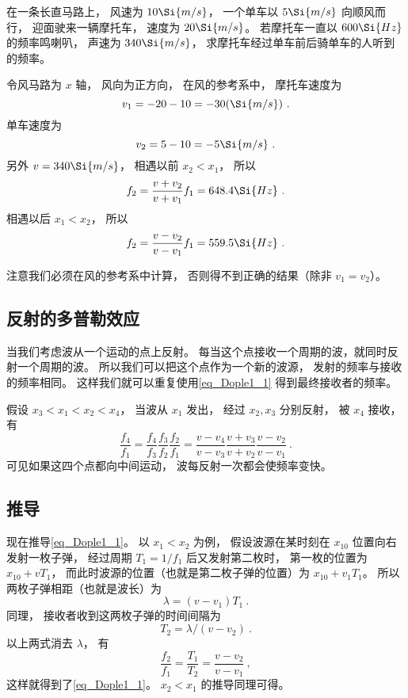 \begin{exercise}{}
在一条长直马路上， 风速为 $10\Si{m/s}$， 一个单车以 $5\Si{m/s}$ 向顺风而行， 迎面驶来一辆摩托车， 速度为 $20\Si{m/s}$。 若摩托车一直以 $600\Si{Hz}$ 的频率鸣喇叭， 声速为 $340\Si{m/s}$， 求摩托车经过单车前后骑单车的人听到的频率。

令风马路为 $x$ 轴， 风向为正方向， 在风的参考系中， 摩托车速度为
\begin{equation}
v_1 = -20 - 10 = -30(\Si{m/s})~.
\end{equation}
单车速度为
\begin{equation}
v_2 = 5 - 10 = -5\Si{m/s}~.
\end{equation}
另外 $v = 340\Si{m/s}$， 相遇以前 $x_2 < x_1$， 所以
\begin{equation}
f_2 = \frac{v + v_2}{v + v_1} f_1 = 648.4\Si{Hz}~.
\end{equation}
相遇以后 $x_1 < x_2$， 所以
\begin{equation}
f_2 = \frac{v - v_2}{v - v_1} f_1 = 559.5\Si{Hz}~.
\end{equation}
\end{exercise}
注意我们必须在风的参考系中计算， 否则得不到正确的结果（除非 $v_1 = v_2$）。

\subsection{反射的多普勒效应}
当我们考虑波从一个运动的点上反射。 每当这个点接收一个周期的波，就同时反射一个周期的波。 所以我们可以把这个点作为一个新的波源， 发射的频率与接收的频率相同。 这样我们就可以重复使用\autoref{eq_Dople1_1} 得到最终接收者的频率。

\begin{example}{}
假设 $x_3 < x_1 < x_2 < x_4$， 当波从 $x_1$ 发出， 经过 $x_2, x_3$ 分别反射， 被 $x_4$ 接收， 有
\begin{equation}
\frac{f_4}{f_1} = \frac{f_4}{f_3}\frac{f_3}{f_2}\frac{f_2}{f_1}
= \frac{v - v_4}{v - v_3}\frac{v + v_3}{v + v_2}\frac{v - v_2}{v - v_1}~.
\end{equation}
可见如果这四个点都向中间运动， 波每反射一次都会使频率变快。
\end{example}

\subsection{推导}
现在推导\autoref{eq_Dople1_1}。 以 $x_1 < x_2$ 为例， 假设波源在某时刻在 $x_{10}$ 位置向右发射一枚子弹， 经过周期 $T_1 = 1/f_1$ 后又发射第二枚时， 第一枚的位置为 $x_{10} + vT_1$， 而此时波源的位置（也就是第二枚子弹的位置）为 $x_{10} + v_1 T_1$。 所以两枚子弹相距（也就是波长）为
\begin{equation}
\lambda = (v - v_1)T_1~.
\end{equation}
同理， 接收者收到这两枚子弹的时间间隔为
\begin{equation}
T_2 = \lambda/ (v - v_2)~.
\end{equation}
以上两式消去 $\lambda$， 有
\begin{equation}
\frac{f_2}{f_1} = \frac{T_1}{T_2} = \frac{v - v_2}{v - v_1}~,
\end{equation}
这样就得到了\autoref{eq_Dople1_1}。 $x_2 < x_1$ 的推导同理可得。

